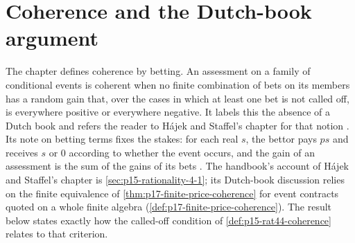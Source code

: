 \section{Coherence and the Dutch-book argument}
\label{sec:p15-w02b-p15-038-dutch-book}

The chapter defines coherence by betting. An assessment on a family of
conditional events is coherent when no finite combination of bets on
its members has a random gain that, over the cases in which at least
one bet is not called off, is everywhere positive or everywhere
negative. It labels this the absence of a Dutch book and refers the
reader to H\'ajek and Staffel's chapter for that notion
\cite[p.~278]{Pfeifer2021ProbabilityLogic}. Its note on betting terms
fixes the stakes: for each real \(s\), the bettor pays \(ps\) and
receives \(s\) or \(0\) according to whether the event occurs, and the
gain of an assessment is the sum of the gains of its bets
\cite[p.~282, note~3]{Pfeifer2021ProbabilityLogic}. The handbook's
account of H\'ajek and Staffel's chapter is
\cref{sec:p15-rationality-4-1}; its Dutch-book discussion relies on the
finite equivalence of \cref{thm:p17-finite-price-coherence} for event
contracts quoted on a whole finite algebra
(\cref{def:p17-finite-price-coherence}). The result below states exactly
how the called-off condition of \cref{def:p15-rat44-coherence} relates
to that criterion.

